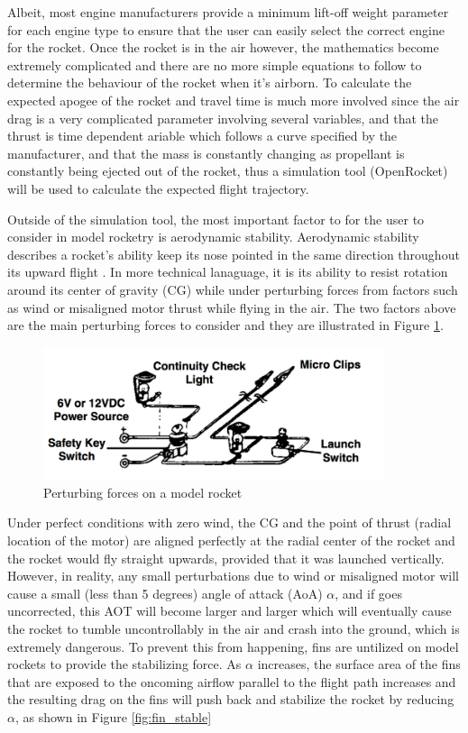 \documentclass{workreport}
\begin{document}
\begin{body}
	Albeit, most engine manufacturers provide a minimum lift-off weight parameter for each engine type to ensure that the user can easily select the correct engine for the rocket. Once the rocket is in the air however, the mathematics become extremely complicated and there are no more simple equations to follow to determine the behaviour of the rocket when it's airborn. To calculate the expected apogee of the rocket and travel time is much more involved since the air drag is a very complicated parameter involving several variables, and that the thrust is time dependent ariable which follows a curve specified by the manufacturer, and that the mass is constantly changing as propellant is constantly being ejected out of the rocket, thus a simulation tool (OpenRocket) will be used to calculate the expected flight trajectory.

	Outside of the simulation tool, the most important factor to for the user to consider in model rocketry is aerodynamic stability. Aerodynamic stability describes a rocket's ability keep its nose pointed in the same direction throughout its upward flight \cite{estes_rocket_tech}. In more technical lanaguage, it is its ability to resist rotation around its center of gravity (CG) while under perturbing forces from factors such as wind or misaligned motor thrust while flying in the air. The two factors above are the main perturbing forces to consider and they are illustrated in Figure \ref{fig:forces}.

	\begin{figure}[!ht]
		\centering
		\includegraphics[width=10cm]{./images/forces.png}
		\caption{Perturbing forces on a model rocket}
		\label{fig:forces}
	\end{figure}

	Under perfect conditions with zero wind, the CG and the point of thrust (radial location of the motor) are aligned perfectly at the radial center of the rocket and the rocket would fly straight upwards, provided that it was launched vertically. However, in reality, any small perturbations due to wind or misaligned motor will cause a small (less than 5 degrees) angle of attack (AoA) $\alpha$, and if goes uncorrected, this AOT will become larger and larger which will eventually cause the rocket to tumble uncontrollably in the air and crash into the ground, which is extremely dangerous. To prevent this from happening, fins are untilized on model rockets to provide the stabilizing force. As $\alpha$ increases, the surface area of the fins that are exposed to the oncoming airflow parallel to the flight path increases and the resulting drag on the fins will push back and stabilize the rocket by reducing $\alpha$, as shown in Figure \ref{fig:fin_stable}


\end{body}
\end{document}
